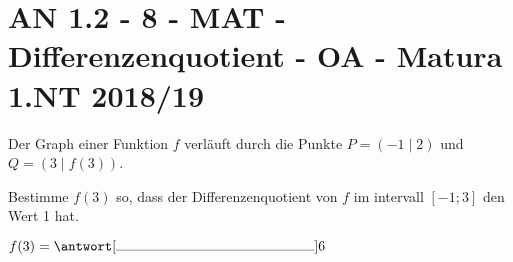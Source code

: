 \section{AN 1.2 - 8 - MAT - Differenzenquotient - OA - Matura 1.NT 2018/19}

\begin{beispiel}[AN 1.2]{1}
Der Graph einer Funktion $f$ verläuft durch die Punkte $P=(-1\mid 2)$ und $Q=(3\mid f(3))$.

Bestimme $f(3)$ so, dass der Differenzenquotient von $f$ im intervall $[-1;3]$ den Wert 1 hat.\leer

$f(3)=\antwort[\rule{5cm}{0.3pt}]{6}$
\end{beispiel}
